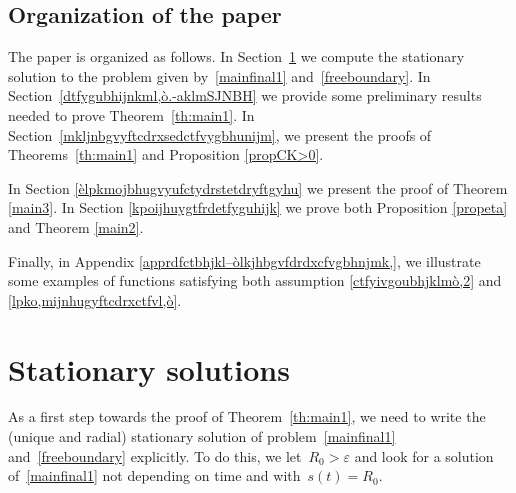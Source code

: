 \documentclass[12pt,a4paper,intlimits,sumlimits]{amsart}
\theoremstyle{definition}
\theoremstyle{plain}
\numberwithin{equation}{section}
\begin{document}


\subsection{Organization of the paper}
The paper is organized as follows.
In Section~\ref{dertfyuiokpl} we compute the stationary solution to the problem given by~\eqref{mainfinal1} and~\eqref{freeboundary}. In Section~\ref{dtfygubhijnkml,ò.-aklmSJNBH} we provide some preliminary results needed to prove Theorem~\ref{th:main1}. In Section~\ref{mkljnbgvyftcdrxsedctfvygbhunijm}, we present the proofs of Theorems~\ref{th:main1} and Proposition \ref{propCK>0}.

In Section \ref{èlpkmojbhugvyufctydrstetdryftgyhu} we present the proof of Theorem \ref{main3}. In Section \ref{kpoijhuygtfrdetfyguhijk} we prove both Proposition \ref{propeta} and Theorem \ref{main2}.
  
Finally, in Appendix \ref{apprdfctbhjkl–òlkjhbgvfdrdxcfvgbhnjmk,}, we illustrate some examples of functions satisfying both assumption \eqref{ctfyivgoubhjklmò,2} and \eqref{lpko,mijnhugyftcdrxctfvl,ò}.

\section{Stationary solutions}\label{dertfyuiokpl}
As a first step towards the proof of Theorem~\ref{th:main1}, we need to write the (unique and radial) stationary solution of problem~\eqref{mainfinal1} and~\eqref{freeboundary} explicitly. To do this, we let~$R_0>\varepsilon$ and look for a solution of~\eqref{mainfinal1} not depending on time and with~$s(t)=R_0$.
\end{document}
